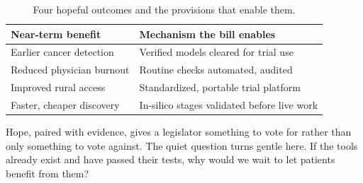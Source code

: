 \begin{table}[H]
\footnotesize
\begin{tabularx}{\textwidth}{@{}L{4.4cm} Y@{}}
\toprule
\textbf{Near-term benefit} & \textbf{Mechanism the bill enables}\\
\midrule
Earlier cancer detection & Verified models cleared for trial use\\
Reduced physician burnout & Routine checks automated, audited\\
Improved rural access & Standardized, portable trial platform\\
Faster, cheaper discovery & In-silico stages validated before live work\\
\bottomrule
\end{tabularx}
\caption{Four hopeful outcomes and the provisions that enable them.}
\label{tab:hope}
\end{table}

Hope, paired with evidence, gives a legislator something to vote for rather than
only something to vote against. The quiet question turns gentle here. If the tools
already exist and have passed their tests, why would we wait to let patients
benefit from them?
